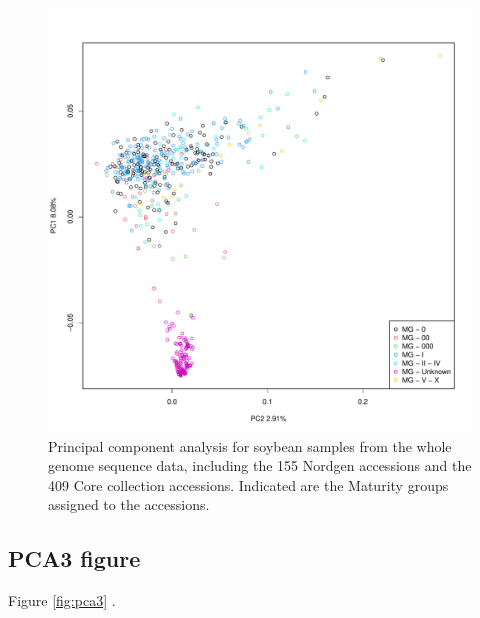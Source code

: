 \documentclass[9pt, twocolumn,twoside]{gsajnl}
\begin{document}
\begin{figure}[t]
\centering
\includegraphics[width=\linewidth]{plot_PCA_mg1.pdf}
\caption{Principal component analysis for soybean samples from the whole genome sequence data, including the 155 Nordgen accessions and the 409 Core collection accessions. Indicated are the Maturity groups assigned to the accessions.}
\label{fig:pca2}
\end{figure}


\subsection{PCA3 figure}


Figure \ref{fig:pca3} .
\end{document}
